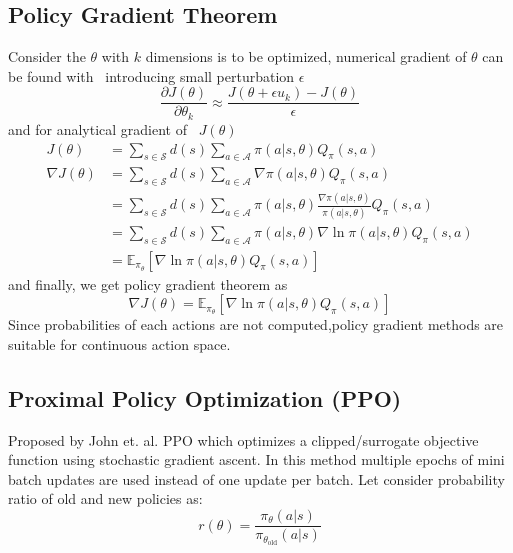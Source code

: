 \subsection{Policy Gradient Theorem}
Consider the $\displaystyle \theta $ with $\displaystyle k$ dimensions is to be optimized, numerical gradient of $\displaystyle \theta $ can be found with \ introducing small perturbation $\displaystyle \epsilon $ 
\begin{equation}
\frac{\partial J(\theta )}{\partial \theta _{k}} \approx \frac{J(\theta +\epsilon u_{k} )-J(\theta )}{\epsilon }
\end{equation}
 and for analytical gradient of \ $\displaystyle J(\theta )$
\begin{equation}
\begin{aligned}
J(\theta ) & =\sum _{s\in \mathcal{S}} d(s)\sum _{a\in \mathcal{A}} \pi (a|s,\theta )Q_{\pi } (s,a)\\
\nabla J(\theta ) & =\sum _{s\in \mathcal{S}} d(s)\sum _{a\in \mathcal{A}} \nabla \pi (a|s,\theta )Q_{\pi } (s,a)\\
 & =\sum _{s\in \mathcal{S}} d(s)\sum _{a\in \mathcal{A}} \pi (a|s,\theta )\frac{\nabla \pi (a|s,\theta )}{\pi (a|s,\theta )} Q_{\pi } (s,a)\\
 & =\sum _{s\in \mathcal{S}} d(s)\sum _{a\in \mathcal{A}} \pi (a|s,\theta )\nabla \ln \pi (a|s,\theta )Q_{\pi } (s,a)\\
 & =\mathbb{E}_{\pi _{\theta }} [\nabla \ln \pi (a|s,\theta )Q_{\pi } (s,a)]
\end{aligned}
\end{equation}
and finally, we get policy gradient theorem as
\begin{equation}
\nabla J(\theta )=\mathbb{E}_{\pi _{\theta }} [\nabla \ln \pi (a|s,\theta )Q_{\pi } (s,a)]
\end{equation}
Since probabilities of each actions are not computed,policy gradient methods are suitable for continuous action space.

\subsection{Proximal Policy Optimization (PPO)}
Proposed by John et. al. PPO\cite{schulman2017proximal} which optimizes a clipped/surrogate objective function using stochastic gradient ascent. In this method multiple epochs of mini batch updates are used instead of one update per batch. Let consider probability ratio of old and new policies as:
\begin{equation}
r(\theta )=\frac{\pi _{\theta } (a|s)}{\pi _{\theta _{\text{old}}} (a|s)}
\end{equation}

